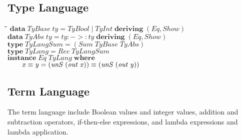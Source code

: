 \documentclass[10pt]{article}
\newlength{\lwidth}\setlength{\lwidth}{4.5cm}
\newlength{\cwidth}\setlength{\cwidth}{8mm} %
\newcommand{\Conid}[1]{\mathit{#1}}
\newcommand{\Varid}[1]{\mathit{#1}}
\begin{document}
\subsection{Type Language}

\begin{tabbing}
\qquad\=\hspace{\lwidth}\=\hspace{\cwidth}\=\+\kill
${\mathbf{data}\;\Conid{TyBase}\;\Varid{ty}\mathrel{=}\Conid{TyBool}\mid \Conid{TyInt}\;\mathbf{deriving}\;(\Conid{Eq},\Conid{Show})}$\\
${}$\\
${\mathbf{data}\;\Conid{TyAbs}\;\Varid{ty}\mathrel{=}\Varid{ty}\mathbin{:->:}\Varid{ty}\;\mathbf{deriving}\;(\Conid{Eq},\Conid{Show})}$\\
${}$\\
${\mathbf{type}\;\Conid{TyLangSum}\mathrel{=}(\Conid{Sum}\;\Conid{TyBase}\;\Conid{TyAbs})}$\\
${}$\\
${\mathbf{type}\;\Conid{TyLang}\mathrel{=}\Conid{Rec}\;\Conid{TyLangSum}}$\\
${}$\\
${\mathbf{instance}\;\Conid{Eq}\;\Conid{TyLang}\;\mathbf{where}}$\\
${\hskip2.00em\relax\Varid{x}\equiv \Varid{y}\mathrel{=}(\Varid{unS}\;(\Varid{out}\;\Varid{x}))\equiv (\Varid{unS}\;(\Varid{out}\;\Varid{y}))}$
\end{tabbing}
\subsection{Term Language}

The term language include Boolean values and integer values, addition
and subtraction operators, if-then-else expressions, and lambda
expressions and lambda application.
\end{document}
